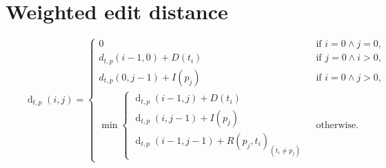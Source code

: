 \clearpage
\section{Weighted edit distance}

\begin{equation*}
  \qquad\operatorname{d}_{t,p}(i,j) =
  \begin{cases}
    0 & \text{ if } i=0 \land j = 0,\\
    {d}_{t,p}(i-1,0) + D(t_i) & \text{ if } j=0 \land i > 0, \\
    {d}_{t,p}(0,j-1) + I(p_j) & \text{ if } i=0 \land j > 0, \\
    \min
      \begin{cases}
        \operatorname{d}_{t,p}(i-1,j) + D(t_i) \\
        \operatorname{d}_{t,p}(i,j-1) + I(p_j) \\
        \operatorname{d}_{t,p}(i-1,j-1) + R(p_j,t_i)_{(t_i \neq p_j)}
      \end{cases} & \text{ otherwise.}
  \end{cases}
\end{equation*}

